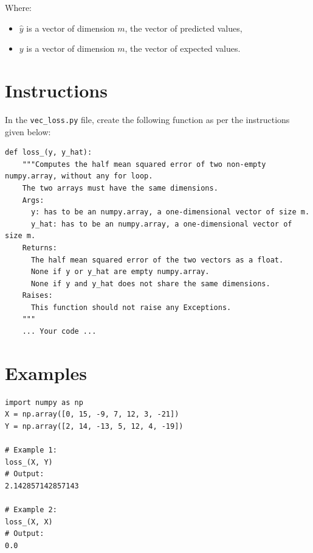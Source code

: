 \documentclass{42-en}
\begin{document}
Where:
\begin{itemize}
  \item $\hat{y}$ is a vector of dimension $m$, the vector of predicted values,
  \item $y$ is a vector of dimension $m$, the vector of expected values.
\end{itemize}

\newpage

\section*{Instructions}
In the \texttt{vec\_loss.py} file, create the following function as per the instructions given below:

\begin{verbatim}
def loss_(y, y_hat):
    """Computes the half mean squared error of two non-empty numpy.array, without any for loop.
    The two arrays must have the same dimensions.
    Args:
      y: has to be an numpy.array, a one-dimensional vector of size m.
      y_hat: has to be an numpy.array, a one-dimensional vector of size m.
    Returns:
      The half mean squared error of the two vectors as a float.
      None if y or y_hat are empty numpy.array.
      None if y and y_hat does not share the same dimensions.
    Raises:
      This function should not raise any Exceptions.
    """
    ... Your code ...
\end{verbatim}


\section*{Examples}
\begin{verbatim}
import numpy as np
X = np.array([0, 15, -9, 7, 12, 3, -21])
Y = np.array([2, 14, -13, 5, 12, 4, -19])

# Example 1:
loss_(X, Y)
# Output:
2.142857142857143

# Example 2:
loss_(X, X)
# Output:
0.0
\end{verbatim}


\newpage
\end{document}
